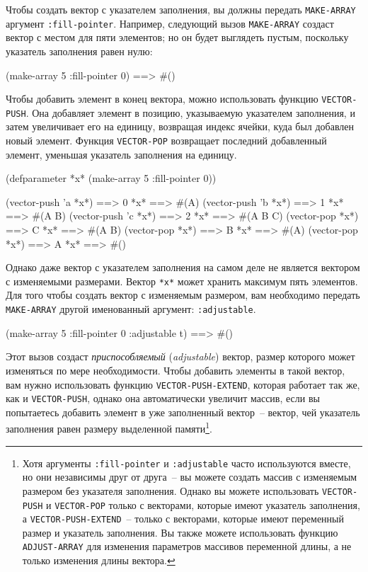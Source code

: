 Чтобы создать вектор с указателем заполнения, вы должны передать \lstinline{MAKE-ARRAY}
аргумент \lstinline{:fill-pointer}.  Например, следующий вызов \lstinline{MAKE-ARRAY} создаст вектор
с местом для пяти элементов; но он будет выглядеть пустым, поскольку указатель заполнения
равен нулю:

\begin{myverb}
  (make-array 5 :fill-pointer 0) ==> #()
\end{myverb}

Чтобы добавить элемент в конец вектора, можно использовать функцию
\lstinline{VECTOR-PUSH}.  Она добавляет элемент в позицию, указываемую указателем заполнения, и
затем увеличивает его на единицу, возвращая индекс ячейки, куда был добавлен новый
элемент.  Функция \lstinline{VECTOR-POP} возвращает последний добавленный элемент, уменьшая
указатель заполнения на единицу.

\begin{myverb}
  (defparameter *x* (make-array 5 :fill-pointer 0))
  
  (vector-push 'a *x*) ==> 0
  *x*                  ==> #(A)
  (vector-push 'b *x*) ==> 1
  *x*                  ==> #(A B)
  (vector-push 'c *x*) ==> 2
  *x*                  ==> #(A B C)
  (vector-pop *x*)     ==> C
  *x*                  ==> #(A B)
  (vector-pop *x*)     ==> B
  *x*                  ==> #(A)
  (vector-pop *x*)     ==> A
  *x*                  ==> #()
\end{myverb}

Однако даже вектор с указателем заполнения на самом деле не является вектором с изменяемыми
размерами.  Вектор \lstinline{*x*} может хранить максимум пять элементов.  Для того чтобы
создать вектор с изменяемым размером, вам необходимо передать \lstinline{MAKE-ARRAY} другой
именованный аргумент: \lstinline{:adjustable}.

\begin{myverb}
  (make-array 5 :fill-pointer 0 :adjustable t) ==> #()
\end{myverb}

Этот вызов создаст \textit{приспособляемый} (\textit{adjustable}) вектор, размер которого
может изменяться по мере необходимости.  Чтобы
добавить элементы в такой вектор, вам нужно использовать функцию
\lstinline{VECTOR-PUSH-EXTEND}, которая работает так же, как и \lstinline{VECTOR-PUSH}, однако
она автоматически увеличит массив, если вы попытаетесь добавить элемент в
уже заполненный вектор~-- вектор, чей указатель заполнения равен размеру выделенной
памяти\footnote{Хотя аргументы \lstinline{:fill-pointer} и \lstinline{:adjustable} часто используются
  вместе, но они независимы друг от друга~-- вы можете создать
  массив с изменяемым размером без указателя заполнения.  Однако вы можете использовать
  \lstinline{VECTOR-PUSH} и \lstinline{VECTOR-POP} только с векторами, которые имеют указатель
  заполнения, а \lstinline{VECTOR-PUSH-EXTEND}~-- только с векторами, которые имеют переменный
  размер и указатель заполнения.  Вы также можете использовать функцию \lstinline{ADJUST-ARRAY}
  для изменения параметров массивов переменной длины, а не только изменения длины
  вектора.}.


